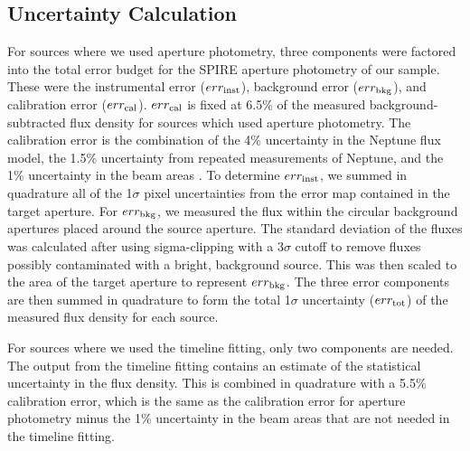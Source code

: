 \subsection{Uncertainty Calculation}
For sources where we used aperture photometry, three components were factored into the total error budget for the SPIRE aperture photometry of our sample. These were the instrumental error ($err_{\rm{inst}}$), background error ($err_{\rm{bkg}}$), and calibration error ($err_{\rm{cal}}$). $err_{\rm{cal}}$ is fixed at 6.5\% of the measured background-subtracted flux density for sources which used aperture photometry. The calibration error is the combination of the 4\% uncertainty in the Neptune flux model, the 1.5\% uncertainty from repeated measurements of Neptune, and the 1\% uncertainty in the beam areas \citep{Bendo:2013sd}. To determine $err_{\rm{inst}}$, we summed in quadrature all of the 1$\sigma$ pixel uncertainties from the error map contained in the target aperture. For $err_{\rm{bkg}}$, we measured the flux within the circular background apertures placed around the source aperture. The standard deviation of the fluxes was calculated after using sigma-clipping with a 3$\sigma$ cutoff to remove fluxes possibly contaminated with a bright, background source.  This was then scaled to the area of the target aperture to represent $err_{\rm{bkg}}$.  The three error components are then summed in quadrature to form the total 1$\sigma$ uncertainty ($err_{\rm{tot}}$) of the measured flux density for each source.

For sources where we used the timeline fitting, only two components are needed. The output from the timeline fitting contains an estimate of the statistical uncertainty in the flux density. This is combined in quadrature with a 5.5\% calibration error, which is the same as the calibration error for aperture photometry minus the 1\% uncertainty in the beam areas that are not needed in the timeline fitting.